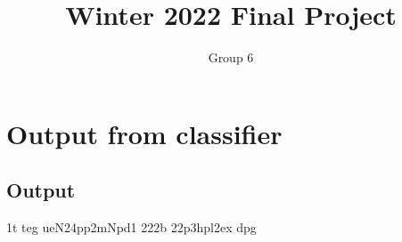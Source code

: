 \documentclass[11pt]{article}
\title{Winter 2022 Final Project}
\author{Group 6}
\begin{document}
\maketitle
\tableofcontents\newpage\newpage
\section{Output from classifier}
\label{section1}
\subsection{Output}
\label{Sec1_L2_Introduction}
1t teg ueN24pp2mNpd1 222b    22p3hpl2ex dpg
\end{document}
